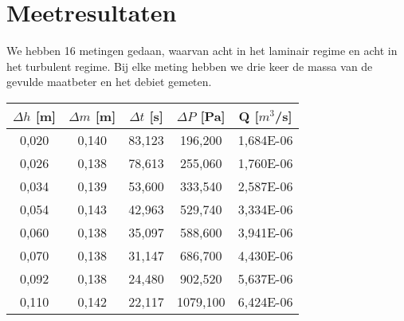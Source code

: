 \section{Meetresultaten}

We hebben 16 metingen gedaan, waarvan acht in het laminair regime en 
acht in het turbulent regime. Bij elke meting hebben we drie keer de massa 
van de gevulde maatbeter en het debiet gemeten.
\begin{center}
    
    \begin{tabular}{| c | c | c | c | c |}
        \hline
        $\Delta h$ [m]  & $\Delta m$ [m]    & $\Delta t$ [s]    & $\Delta P$ [Pa]   & Q [$m^3$/s]      \\ \hline
        0,020           & 0,140             & 83,123            & 196,200           & 1,684E-06        \\ \hline
        0,026           & 0,138             & 78,613            & 255,060           & 1,760E-06         \\ \hline
        0,034           & 0,139             & 53,600            & 333,540           & 2,587E-06         \\ \hline
        0,054           & 0,143             & 42,963            & 529,740           & 3,334E-06         \\ \hline 
        0,060           & 0,138             & 35,097            & 588,600           & 3,941E-06         \\ \hline
        0,070           & 0,138             & 31,147            & 686,700           & 4,430E-06         \\ \hline
        0,092           & 0,138             & 24,480            & 902,520           & 5,637E-06         \\ \hline
        0,110           & 0,142             & 22,117            & 1079,100          & 6,424E-06         \\ \hline
    \end{tabular}
\end{center}

